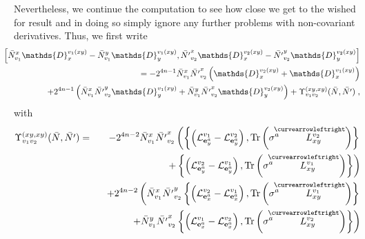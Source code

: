 \documentclass[12pt]{article}
\newcommand{\nn}{\nonumber}
\def\cl{{\cal L}}
\begin{document}
\begin{appendix}
Nevertheless, we continue the computation to see how close we get to the wished for result and in doing so simply ignore any further problems with non-covariant derivatives. Thus, we first write
%
\begin{eqnarray}
&&\hspace{-0.8cm}\left[
\bar{N}_{v_1}^x \mathds{D}_x^{v_1(xy)} -  \bar{N}_{v_1}^y \mathds{D}_y^{v_1(xy)} , \bar{N'}_{v_2}^{x} \mathds{D}_x^{v_2(xy)} -  \bar{N'}_{v_2}^y \mathds{D}_y^{v_2(xy)} 
 \right]  \nn\\
&&=-2^{4n-1}
 \bar{N}_{v_1}^x  \bar{N'}_{v_2}^x \left( \mathds{D}_x^{v_2(xy)}
 + \mathds{D}_x^{v_1(xy)} \right)
\nn\\
&&
+2^{4n-1}
    \left( \bar{N}_{v_1}^x  \bar{N'}_{v_2}^y\mathds{D}_y^{v_1(xy)}
+\bar{N}_{v_1}^y  \bar{N'}_{v_2}^x \mathds{D}_y^{v_2(xy)}  \right)
 +\Upsilon_{v_1v_2}^{(xy,xy)} (\bar{N},\bar{N'}) \;,
%
 \label{TORBEN}
\end{eqnarray}
with
\begin{eqnarray}
\Upsilon_{v_1v_2}^{(xy,xy)} (\bar{N},\bar{N'}) 
&=&-2^{4n-2}
 \bar{N}_{v_1}^x  \bar{N'}_{v_2}^x \left( \left\{    \left(  \cl^{v_1}_{{\bf e}^a_y} -  \cl^{v_2}_{{\bf e}^a_y}\right)  , \mbox{Tr} \left( \sigma^a  \stackrel{\hspace{-3mm}\curvearrowleftright}{L^{v_2}_{xy}} \right) \right\}
\right.\nn\\
&&\hspace{2.5cm}\left.
 + \left\{   \left(  \cl^{v_2}_{{\bf e}^a_y} -  \cl^{v_1}_{{\bf e}^a_y} \right) ,   \mbox{Tr} \left( \sigma^a  \stackrel{\hspace{-3mm}\curvearrowleftright}{L^{v_1}_{xy}} \right) \right\}  \right)
\nn\\
&&+2^{4n-2}
  \left(  \bar{N}_{v_1}^x  \bar{N'}_{v_2}^y  \left\{  \left(   \cl^{v_2}_{{\bf e}^a_x} -  \cl^{v_1}_{{\bf e}^a_x}  \right)  ,  \mbox{Tr} \left( \sigma^a  \stackrel{\hspace{-3mm}\curvearrowleftright}{L^{v_1}_{xy}} \right) \right\} 
\right.\nn\\
&&\hspace{1.2cm}\left.
+  \bar{N}_{v_1}^y  \bar{N'}_{v_2}^x  \left\{   \left(  \cl^{v_1}_{{\bf e}^a_x}  -  \cl^{v_2}_{{\bf e}^a_x}   \right) , \mbox{Tr} \left( \sigma^a  \stackrel{\hspace{-3mm}\curvearrowleftright}{L^{v_2}_{xy}} \right) \right\}\right)
\label{facebook}
 \end{eqnarray}






\end{appendix}
\end{document}
